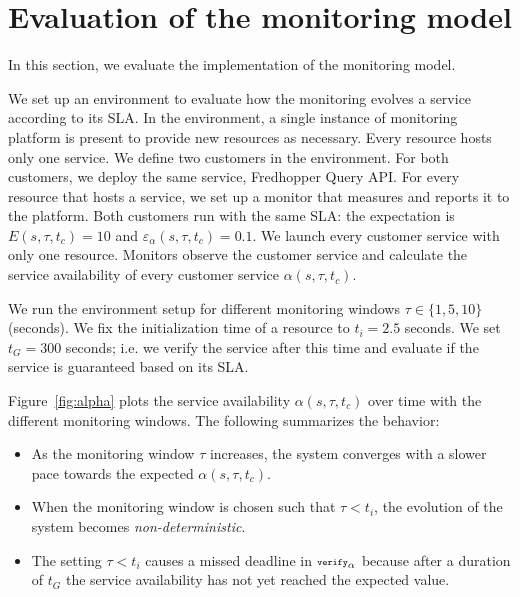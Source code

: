 
\section{Evaluation of the monitoring model} %
\label{sec:implementation}

In this section, we evaluate the implementation of the monitoring model.

We set up an environment to evaluate how the monitoring evolves a service according to its SLA. 
In the environment, a single instance of monitoring platform is present to provide new resources as necessary.
Every resource hosts only one service.
We define two customers in the environment.
For both customers, we deploy the same service, Fredhopper Query API.
For every resource that hosts a service, we set up a monitor that measures \qps and reports it to the platform.
Both customers run with the same SLA: the \qps expectation is $E(s,\tau,t_c) = 10$ and $\varepsilon_\alpha(s,\tau,t_c) = 0.1$.
We launch every customer service with only one resource.
Monitors observe the customer service and calculate the service availability of every customer service $\alpha(s,\tau,t_c)$.

We run the environment setup for different monitoring windows $\tau \in \{1,5,10\}$ (seconds).
We fix the initialization time of a resource to $t_i = 2.5$ seconds.
We set $t_G = 300$ seconds; i.e. we verify the service after this time and evaluate if the service is guaranteed based on its SLA. 

Figure~\ref{fig:alpha} plots the service availability $\alpha(s,\tau,t_c)$ over time with the different monitoring windows.
The following summarizes the behavior:
\begin{itemize}
\item As the monitoring window $\tau$ increases, the system converges with a slower pace towards the expected $\alpha(s,\tau,t_c)$.
\item When the monitoring window is chosen such that $\tau < t_i$, the evolution of the system becomes \emph{non-deterministic}.
\item The setting $\tau < t_i$ causes a missed deadline in ${\scriptsize\texttt{verify}}_\alpha$ because after a duration of $t_G$ the service availability has not yet reached the expected value.  
\end{itemize}

